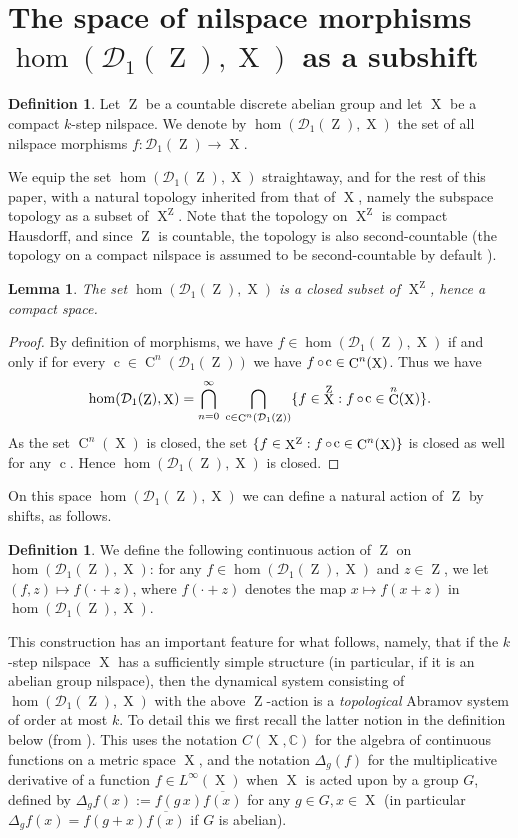 \documentclass[a4paper,12pt,reqno]{amsart}
\newtheorem{lemma}[theorem]{Lemma}
\theoremstyle{definition}
\newtheorem{defn}[theorem]{Definition}
\newcommand{\mc}{\mathcal}
\newcommand{\mb}{\mathbb}
\DeclareMathOperator{\ab}{Z}
\DeclareMathOperator{\q}{c}
\DeclareMathOperator{\ns}{X}
\DeclareMathOperator{\co}{\circ\hspace{-0.02 cm}}
\DeclareMathOperator{\cu}{C}
\begin{document}
\section{\texorpdfstring{The space of nilspace morphisms $\hom(\mc{D}_1(\ab),\ns)$ as a subshift}{The space of nilspace morphisms hom(D1(Z),X) as a subshift}}\label{sec:homspace}
\begin{defn}
Let $\ab$ be a countable discrete abelian group and let $\ns$ be a compact $k$-step nilspace. We denote by $\hom(\mc{D}_1(\ab),\ns)$ the set of all nilspace morphisms $f:\mc{D}_1(\ab)\to \ns$.
\end{defn}
\noindent We equip the set $\hom(\mc{D}_1(\ab),\ns)$  straightaway, and for the rest of this paper, with a natural topology inherited from that of $\ns$, namely the subspace topology as a subset of $\ns^{\ab}$. Note that the topology on $\ns^{\ab}$ is compact Hausdorff, and since $\ab$ is countable, the topology is also second-countable (the topology on a compact nilspace is assumed to be second-countable by default \cite{Cand:Notes2}).

\begin{lemma}
The set $\hom(\mc{D}_1(\ab),\ns)$ is a closed subset of $\ns^{\ab}$, hence a compact space.
\end{lemma}

\begin{proof}
By definition of morphisms, we have $f\in \hom(\mc{D}_1(\ab),\ns)$ if and only if for every $\q\in \cu^n(\mc{D}_1(\ab))$ we have $f\co \q\in \cu^n(\ns)$. Thus we have
\[
\hom(\mc{D}_1(\ab),\ns) = \bigcap_{n=0}^\infty\; \bigcap_{\q\in \cu^n(\mc{D}_1(\ab))} \{f\in \ns^{\ab}: f\co \q \in \cu^n(\ns) \}.
\]
As the set $\cu^n(\ns)$ is closed, the set $\{f\in \ns^{\ab}: f\co \q \in \cu^n(\ns) \}$ is closed as well for any $\q$. Hence $\hom(\mc{D}_1(\ab),\ns)$ is closed.
\end{proof}

On this space $\hom(\mc{D}_1(\ab),\ns)$ we can define a natural action of $\ab$ by shifts, as follows.

\begin{defn}
 We define the following continuous action of $\ab$ on $\hom(\mc{D}_1(\ab),\ns)$:  for any $f\in \hom(\mc{D}_1(\ab),\ns)$ and $z\in \ab$, we let $(f,z)\mapsto f(\cdot+z)$, where $f(\cdot+z)$ denotes the map $x\mapsto f(x+z)$ in $\hom(\mc{D}_1(\ab),\ns)$.
\end{defn}
\noindent This construction has an important feature for what follows, namely, that if the $k$-step nilspace $\ns$ has a sufficiently simple structure (in particular, if it is an abelian group nilspace), then the dynamical system consisting of $\hom(\mc{D}_1(\ab),\ns)$ with the above $\ab$-action is a \emph{topological} Abramov system of order at most $k$. To detail this we first recall the latter notion in the definition below (from \cite[Definition 5.12]{CGSS-p-hom}). This uses the notation $C(\ns,\mb{C})$ for the algebra of continuous functions on a metric space $\ns$, and the notation $\Delta_g(f)$ for the multiplicative derivative of a function $f\in L^\infty(\ns)$ when $\ns$ is acted upon by a group $G$, defined by $\Delta_g f (x) := f (g\,x)\overline{f (x)}$ for any $g\in G, x\in \ns$ (in particular $\Delta_g f (x) = f (g+ x)\overline{f (x)}$ if $G$ is abelian).
\end{document}
